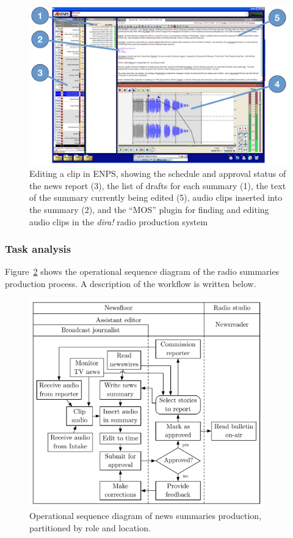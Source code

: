 \begin{figure}[ht]
  \centering
  \includegraphics[width=\columnwidth]{figs/news-enps-labelled.pdf}
  \caption{Editing a clip in ENPS, showing the schedule and approval status of the news report (3), the list of drafts
  for each summary (1), the text of the summary currently being edited (5), audio clips inserted into the summary (2),
  and the ``MOS'' plugin for finding and editing audio clips in the \textit{dira!} radio production system}
  \label{fig:news-enps-edit}
\end{figure}

\subsubsection{Task analysis}
Figure~\ref{fig:news-flowchart} shows the operational sequence diagram of the radio summaries production process. A
description of the workflow is written below.

\begin{figure}[ht]
	\centering
	\includegraphics[width=4in]{figs/news-workflow.pdf}
  \caption{Operational sequence diagram of news summaries production, partitioned by role and location.}
	\label{fig:news-flowchart}
\end{figure}

